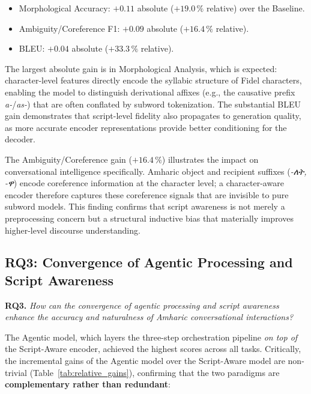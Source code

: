 \begin{itemize}
  \item Morphological Accuracy: $+0.11$ absolute ($+19.0\,\%$ relative) over the Baseline.
  \item Ambiguity/Coreference F1: $+0.09$ absolute ($+16.4\,\%$ relative).
  \item BLEU: $+0.04$ absolute ($+33.3\,\%$ relative).
\end{itemize}

The largest absolute gain is in Morphological Analysis, which is expected: character-level
features directly encode the syllabic structure of Fidel characters, enabling the model to
distinguish derivational affixes (e.g., the causative prefix \textit{a-}/\textit{as-}) that are
often conflated by subword tokenization.  The substantial BLEU gain demonstrates that
script-level fidelity also propagates to generation quality, as more accurate encoder
representations provide better conditioning for the decoder.

The Ambiguity/Coreference gain ($+16.4\,\%$) illustrates the impact on conversational
intelligence specifically.  Amharic object and recipient suffixes (\textit{-ለት, -ዋ}) encode
coreference information at the character level; a character-aware encoder therefore captures
these coreference signals that are invisible to pure subword models.  This finding confirms that
script awareness is not merely a preprocessing concern but a structural inductive bias that
materially improves higher-level discourse understanding.

\subsection{RQ3: Convergence of Agentic Processing and Script Awareness}
\label{sec:rq3}

\textbf{RQ3.} \textit{How can the convergence of agentic processing and script awareness
enhance the accuracy and naturalness of Amharic conversational interactions?}

The Agentic model, which layers the three-step orchestration pipeline \emph{on top of} the
Script-Aware encoder, achieved the highest scores across all tasks.  Critically, the incremental
gains of the Agentic model over the Script-Aware model are non-trivial (Table~\ref{tab:relative_gains}),
confirming that the two paradigms are \textbf{complementary rather than redundant}:

